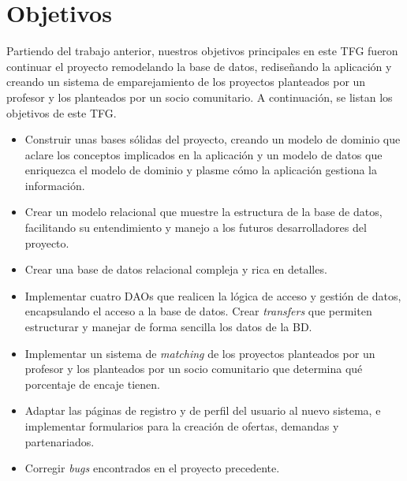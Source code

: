 \documentclass[11pt]{book}
\begin{document}
	\section{Objetivos}
	Partiendo del trabajo anterior, nuestros objetivos principales en este TFG fueron continuar el proyecto remodelando la base de datos, rediseñando la aplicación y creando un sistema de emparejamiento de los proyectos planteados por un profesor y los planteados por un socio comunitario.
	A continuación, se listan los objetivos de este TFG.
	\begin{itemize} 
		\item Construir unas bases sólidas del proyecto, creando un modelo de dominio que aclare los conceptos implicados en la aplicación y un modelo de datos que enriquezca el modelo de dominio y plasme cómo la aplicación gestiona la información.
		\item Crear un modelo relacional que muestre la estructura de la base de datos, facilitando su entendimiento y manejo a los futuros desarrolladores del proyecto.
		\item Crear una base de datos relacional compleja y rica en detalles.
		\item Implementar cuatro DAOs que realicen la lógica de acceso y gestión de datos, encapsulando el acceso a la base de datos. Crear \textit{transfers} que permiten estructurar y manejar de forma sencilla los datos de la BD.
		\item Implementar un sistema de \textit{matching} de los proyectos planteados por un profesor y los planteados por un socio comunitario que determina qué porcentaje de encaje tienen.
		\item Adaptar las páginas de registro y de perfil del usuario al nuevo sistema, e implementar formularios para la creación de ofertas, demandas y partenariados.
		\item Corregir \textit{bugs} encontrados en el proyecto precedente.
	\end{itemize}
\end{document}
